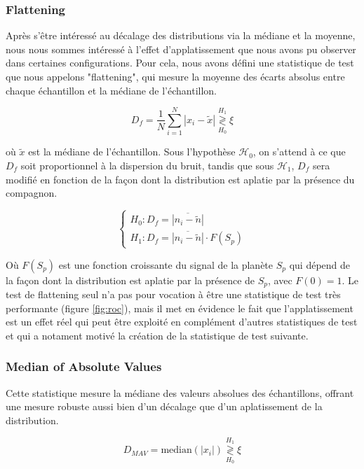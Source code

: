 \documentclass{article}
\begin{document}
\subsubsection{Flattening}

Après s'être intéressé au décalage des distributions via la médiane et la moyenne, nous nous sommes intéressé à l'effet d'applatissement que nous avons pu observer dans certaines configurations. Pour cela, nous avons défini une statistique de test que nous appelons "flattening", qui mesure la moyenne des écarts absolus entre chaque échantillon et la médiane de l'échantillon.

$$
D_f = \frac 1 N \sum_{i=1}^N |x_i - \tilde{x}| \stackrel{H_1}{\underset{H_0}{\gtrless}} \xi
$$

où $\tilde{x}$ est la médiane de l'échantillon. Sous l'hypothèse $\mathcal{H}_0$, on s'attend à ce que $D_f$ soit proportionnel à la dispersion du bruit, tandis que sous $\mathcal{H}_1$, $D_f$ sera modifié en fonction de la façon dont la distribution est aplatie par la présence du compagnon.

$$
\begin{cases}
H_0 : D_f = \overline{|n_i - \tilde{n}|}\\
H_1 : D_f = \overline{|n_i - \tilde{n}|} \cdot F(S_p)
\end{cases}
$$

Où $F(S_p)$ est une fonction croissante du signal de la planète $S_p$ qui dépend de la façon dont la distribution est aplatie par la présence de $S_p$, avec $F(0)=1$. Le test de flattening seul n'a pas pour vocation à être une statistique de test très performante (figure \ref{fig:roc}), mais il met en évidence le fait que l'applatissement est un effet réel qui peut être exploité en complément d'autres statistiques de test et qui a notament motivé la création de la statistique de test suivante.

\subsubsection{Median of Absolute Values}

Cette statistique mesure la médiane des valeurs absolues des échantillons, offrant une mesure robuste aussi bien d'un décalage que d'un aplatissement de la distribution.

$$
D_{MAV} = \text{median}(|x_i|) \stackrel{H_1}{\underset{H_0}{\gtrless}} \xi
$$
\end{document}
